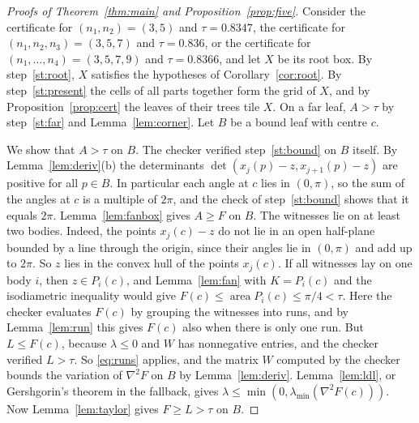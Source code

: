 \documentclass[11pt]{amsart}
\theoremstyle{definition}
\theoremstyle{remark}
\numberwithin{equation}{section}
\newcommand{\area}{\operatorname{area}}
\newcommand{\lmin}{\lambda_{\min}}
\newcommand{\LBTHREE}{0.8347}
\newcommand{\LBFOUR}{0.836}
\newcommand{\LBFIVE}{0.8366}
\begin{document}
\begin{proof}[Proofs of Theorem~\ref{thm:main} and Proposition~\ref{prop:five}]
Consider the certificate for $(n_1,n_2)=(3,5)$ and $\tau=\LBTHREE$, the certificate for $(n_1,n_2,n_3)=(3,5,7)$ and $\tau=\LBFOUR$, or the certificate for $(n_1,\dots,n_4)=(3,5,7,9)$ and $\tau=\LBFIVE$, and let $X$ be its root box. By step~\ref{st:root}, $X$ satisfies the hypotheses of Corollary~\ref{cor:root}. By step~\ref{st:present} the cells of all parts together form the grid of $X$, and by Proposition~\ref{prop:cert} the leaves of their trees tile $X$. On a far leaf, $A>\tau$ by step~\ref{st:far} and Lemma~\ref{lem:corner}. Let $B$ be a bound leaf with centre $c$.

We show that $A>\tau$ on $B$. The checker verified step~\ref{st:bound} on $B$ itself. By Lemma~\ref{lem:deriv}(b) the determinants $\det(x_j(p)-z,x_{j+1}(p)-z)$ are positive for all $p\in B$. In particular each angle at $c$ lies in $(0,\pi)$, so the sum of the angles at $c$ is a multiple of $2\pi$, and the check of step~\ref{st:bound} shows that it equals $2\pi$. Lemma~\ref{lem:fanbox} gives $A\ge F$ on $B$. The witnesses lie on at least two bodies. Indeed, the points $x_j(c)-z$ do not lie in an open half-plane bounded by a line through the origin, since their angles lie in $(0,\pi)$ and add up to $2\pi$. So $z$ lies in the convex hull of the points $x_j(c)$. If all witnesses lay on one body $i$, then $z\in P_i(c)$, and Lemma~\ref{lem:fan} with $K=P_i(c)$ and the isodiametric inequality would give $F(c)\le\area P_i(c)\le\pi/4<\tau$. Here the checker evaluates $F(c)$ by grouping the witnesses into runs, and by Lemma~\ref{lem:run} this gives $F(c)$ also when there is only one run. But $L\le F(c)$, because $\lambda\le0$ and $W$ has nonnegative entries, and the checker verified $L>\tau$. So \eqref{eq:runs} applies, and the matrix $W$ computed by the checker bounds the variation of $\nabla^2F$ on $B$ by Lemma~\ref{lem:deriv}. Lemma~\ref{lem:ldl}, or Gershgorin's theorem in the fallback, gives $\lambda\le\min(0,\lmin(\nabla^2F(c)))$. Now Lemma~\ref{lem:taylor} gives $F\ge L>\tau$ on $B$.


\end{proof}
\end{document}
